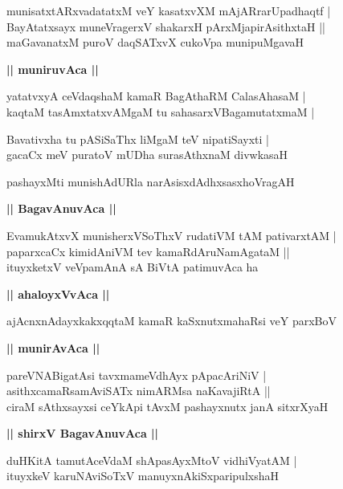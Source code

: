\documentclass[twoside,12pt,openright]{book}
\newcounter{shloka}[chapter]
\def\uvaca#1{\centerline{{\large\textbf{#1}}}}
\begin{document}
\begin{shloka}%
munisatxtARxvadatatxM veY kasatxvXM mAjARrarUpadhaqtf |\\
BayAtatxsayx muneVragerxV shakarxH pArxMjapirAsithxtaH ||\\
maGavanatxM puroV daqSATxvX cukoVpa munipuMgavaH 
\end{shloka}

\uvaca{|| muniruvAca ||}

\begin{shloka}%
yatatvxyA ceVdaqshaM kamaR BagAthaRM CalasAhasaM |\\
kaqtaM tasAmxtatxvAMgaM tu sahasarxVBagamutatxmaM |
\end{shloka}

\begin{shloka}%
Bavativxha tu pASiSaThx liMgaM teV nipatiSayxti |\\
gacaCx meV puratoV mUDha surasAthxnaM divwkasaH
\end{shloka}

\begin{shloka}%
pashayxMti munishAdURla narAsisxdAdhxsasxhoVragAH 
\end{shloka}

\uvaca{|| BagavAnuvAca ||}

\begin{shloka}%
EvamukAtxvX munisherxVSoThxV rudatiVM tAM pativarxtAM |\\
paparxcaCx kimidAniVM tev kamaRdAruNamAgataM ||\\
ituyxketxV veVpamAnA sA BiVtA patimuvAca ha
\end{shloka}

\uvaca{|| ahaloyxVvAca ||}

\begin{shloka}%
ajAcnxnAdayxkakxqqtaM kamaR kaSxnutxmahaRsi veY parxBoV 
\end{shloka}

\uvaca{|| munirAvAca ||}

\begin{shloka}%
pareVNABigatAsi tavxmameVdhAyx pApacAriNiV |\\
asithxcamaRsamAviSATx nimARMsa naKavajiRtA ||\\
ciraM sAthxsayxsi ceYkApi tAvxM pashayxnutx janA sitxrXyaH 
\end{shloka}

\uvaca{|| shirxV BagavAnuvAca ||}

\begin{shloka}%
duHKitA tamutAceVdaM shApasAyxMtoV vidhiVyatAM |\\
ituyxkeV karuNAviSoTxV manuyxnAkiSxparipulxshaH 
\end{shloka}
\end{document}
